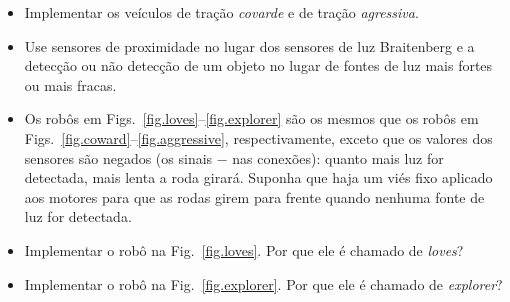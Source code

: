 \begin{framed}
\begin{itemize}
\item Implementar os veículos de tração \emph{covarde} e de tração \emph{agressiva}.
\item Use sensores de proximidade no lugar dos sensores de luz Braitenberg e a detecção ou não detecção de um objeto no lugar de fontes de luz mais fortes ou mais fracas.
\item Os robôs em Figs.~\ref{fig.loves}--\ref{fig.explorer} são os mesmos que os robôs em Figs.~\ref{fig.coward}--\ref{fig.aggressive}, respectivamente, exceto que os valores dos sensores são negados (os sinais $-$ nas conexões): quanto mais luz for detectada, mais lenta a roda girará. Suponha que haja um viés fixo aplicado aos motores para que as rodas girem para frente quando nenhuma fonte de luz for detectada.
\item Implementar o robô na Fig.~\ref{fig.loves}. Por que ele é chamado de \emph{loves}?
\item Implementar o robô na Fig.~\ref{fig.explorer}. Por que ele é chamado de \emph{explorer}?
\end{itemize}
\end{framed}

